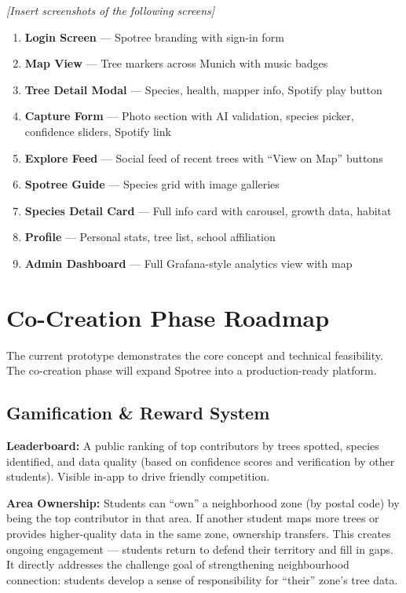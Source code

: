 \documentclass[11pt,a4paper]{article}
\begin{document}
\textit{[Insert screenshots of the following screens]}

\begin{enumerate}[nosep]
  \item \textbf{Login Screen} --- Spotree branding with sign-in form
  \item \textbf{Map View} --- Tree markers across Munich with music badges
  \item \textbf{Tree Detail Modal} --- Species, health, mapper info, Spotify play button
  \item \textbf{Capture Form} --- Photo section with AI validation, species picker, confidence sliders, Spotify link
  \item \textbf{Explore Feed} --- Social feed of recent trees with ``View on Map'' buttons
  \item \textbf{Spotree Guide} --- Species grid with image galleries
  \item \textbf{Species Detail Card} --- Full info card with carousel, growth data, habitat
  \item \textbf{Profile} --- Personal stats, tree list, school affiliation
  \item \textbf{Admin Dashboard} --- Full Grafana-style analytics view with map
\end{enumerate}

\section{Co-Creation Phase Roadmap}

The current prototype demonstrates the core concept and technical feasibility. The co-creation phase will expand Spotree into a production-ready platform.

\subsection{Gamification \& Reward System}

\textbf{Leaderboard:} A public ranking of top contributors by trees spotted, species identified, and data quality (based on confidence scores and verification by other students). Visible in-app to drive friendly competition.

\textbf{Area Ownership:} Students can ``own'' a neighborhood zone (by postal code) by being the top contributor in that area. If another student maps more trees or provides higher-quality data in the same zone, ownership transfers. This creates ongoing engagement --- students return to defend their territory and fill in gaps. It directly addresses the challenge goal of strengthening neighbourhood connection: students develop a sense of responsibility for ``their'' zone's tree data.
\end{document}
